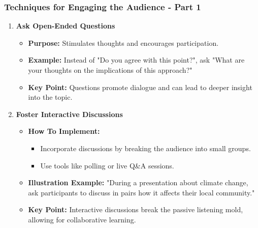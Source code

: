 \documentclass[aspectratio=169]{beamer}
\begin{document}
\begin{frame}[fragile]
    \frametitle{Techniques for Engaging the Audience - Part 1}
    
    \begin{enumerate}
        \item \textbf{Ask Open-Ended Questions}
        \begin{itemize}
            \item \textbf{Purpose:} Stimulates thoughts and encourages participation.
            \item \textbf{Example:} Instead of "Do you agree with this point?", ask "What are your thoughts on the implications of this approach?"
            \item \textbf{Key Point:} Questions promote dialogue and can lead to deeper insight into the topic.
        \end{itemize}
        
        \item \textbf{Foster Interactive Discussions}
        \begin{itemize}
            \item \textbf{How To Implement:} 
            \begin{itemize}
                \item Incorporate discussions by breaking the audience into small groups.
                \item Use tools like polling or live Q\&A sessions.
            \end{itemize}
            \item \textbf{Illustration Example:} "During a presentation about climate change, ask participants to discuss in pairs how it affects their local community."
            \item \textbf{Key Point:} Interactive discussions break the passive listening mold, allowing for collaborative learning.
        \end{itemize}
    \end{enumerate}
\end{frame}
\end{document}
